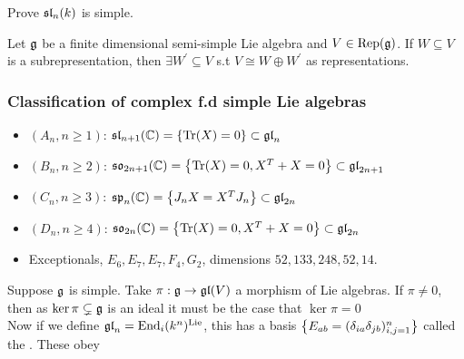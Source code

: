 \documentclass{article}
\begin{document}
\begin{ex}
Prove $\mathfrak{sl}_n(k)$ is simple. 
\end{ex}

\begin{theorem}
Let $\mathfrak{g}$ be a finite dimensional semi-simple Lie algebra and $V \in \operatorname{Rep}(\mathfrak{g})$. If $W \subseteq V$ is a subrepresentation, then $\exists W^\prime \subseteq V$ s.t $V \cong W \oplus W^\prime$ as representations. 
\end{theorem}

\subsubsection{Classification of complex f.d  simple Lie algebras}
\begin{itemize}
    \item $(A_n, n \geq 1)$: $\mathfrak{sl}_{n+1}(\mathbb{C}) = \left\{ \operatorname{Tr}(X) = 0 \right\}\subset \mathfrak{gl}_{n}$ 
    \item $(B_n, n \geq 2)$: $\mathfrak{so}_{2n+1}(\mathbb{C}) = \left\{ \operatorname{Tr}(X) = 0, X^T + X = 0 \right\}\subset \mathfrak{gl}_{2n+1}$
    \item $(C_n, n \geq 3)$: $\mathfrak{sp}_n(\mathbb{C}) = \left\{ J_n X = X^T J_n \right\} \subset \mathfrak{gl}_{2n}$
    \item $(D_n, n\geq 4)$: $\mathfrak{so}_{2n}(\mathbb{C}) = \left\{ \operatorname{Tr}(X) = 0, X^T + X = 0 \right\} \subset \mathfrak{gl}_{2n}$
    \item Exceptionals, $E_6, E_7, E_7, F_4, G_2$, dimensions $52, 133, 248, 52, 14$. 
\end{itemize}

\begin{remark}
Suppose $\mathfrak{g}$ is simple. Take $\pi: \mathfrak{g} \to \mathfrak{gl}(V)$ a morphism of Lie algebras. If $\pi \neq 0$, then as $\ker \pi \subsetneq \mathfrak{g}$ is an ideal it must be the case that $\ker\pi=0$\\
Now if we define $\mathfrak{gl}_n = \operatorname{End}_i(k^n)^{\operatorname{Lie}}$, this has a basis $\left\{ E_{ab} = (\delta_{ia}\delta_{jb})_{i,j=1}^n \right\}$ called the . These obey 
\end{remark}

\subsection{}
\end{document}
